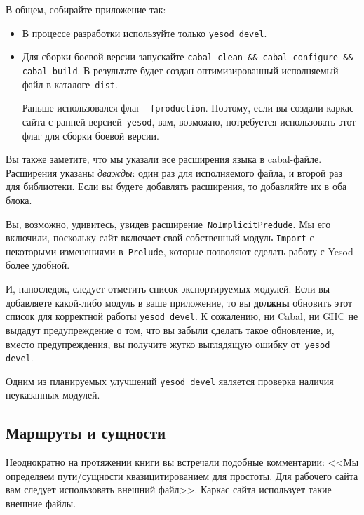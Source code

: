 В общем, собирайте приложение так:
\begin{itemize}
  \item В процессе разработки используйте только \texttt{yesod devel}.
  \item Для сборки боевой версии запускайте \texttt{cabal clean \&\& cabal configure \&\& cabal build}.
    В результате будет создан оптимизированный исполняемый файл в каталоге~\texttt{dist}.

    \begin{remark}
      Раньше использовался флаг~\texttt{-fproduction}. Поэтому, если вы создали
      каркас сайта с ранней версией~\texttt{yesod}, вам, возможно, потребуется
      использовать этот флаг для сборки боевой версии.
    \end{remark}

\end{itemize}

Вы также заметите, что мы указали все расширения языка в cabal-файле.
Расширения указаны \emph{дважды}: один раз для исполняемого файла, и второй раз
для библиотеки. Если вы будете добавлять расширения, то добавляйте их в оба
блока.

Вы, возможно, удивитесь, увидев расширение~\lstinline!NoImplicitPredude!. Мы
его включили, поскольку сайт включает свой собственный модуль
\lstinline!Import! с некоторыми изменениями в~\lstinline!Prelude!, которые
позволяют сделать работу с Yesod более удобной.

И, напоследок, следует отметить список экспортируемых модулей. Если вы
добавляете какой-либо модуль в ваше приложение, то вы \textbf{должны} обновить
этот список для корректной работы \texttt{yesod devel}. К сожалению, ни Cabal,
ни GHC не выдадут предупреждение о том, что вы забыли сделать такое обновление,
и, вместо предупреждения, вы получите жутко выглядящую ошибку от~\texttt{yesod
    devel}.

\begin{remark}
  Одним из планируемых улучшений \texttt{yesod devel} является проверка наличия
  неуказанных модулей.
\end{remark}

\subsection{Маршруты и сущности}
Неоднократно на протяжении книги вы встречали подобные комментарии: <<Мы
определяем пути/сущности квазицитированием для простоты. Для рабочего сайта вам
следует использовать внешний файл>>.  Каркас сайта использует такие внешние
файлы.

